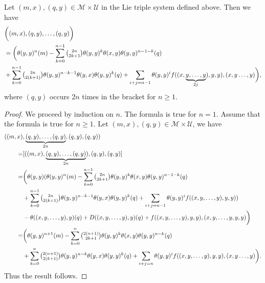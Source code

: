 \documentclass[11pt, twoside]{article}
\begin{document}
\begin{prop}\label{prop6.18}
    Let $(m,x),(q,y)\in \mathcal{M}\times \mathcal{U} $ in the Lie triple system defined above. Then we have \begin{align*}
       & \bigg((m,x),(q,y),\ldots,(q,y)\bigg)\\ &= \bigg(\theta(y,y)^n(m)- \sum\limits_{k=0}^{n-1}\tbinom{2n}{2k+1}\theta(y,y)^k\theta(x,y)\theta(y,y)^{n-1-k}(q)\\ & +\sum\limits_{k=0}^{n-1}\tbinom{2n}{2(k+1)}\theta(y,y)^{n-k-1}\theta(y,x)\theta(y,y)^k(q) + \sum\limits_{i+j=n-1}\theta(y,y)^if((x,\underbrace{y,\ldots,y}_{2j}),y,y), (x,y\ldots,y)\bigg),
    \end{align*} where $(q,y) $ occurs $2n$ times in the bracket for $n\geq 1$.
\end{prop}

\begin{proof}
    We proceed by induction on $n$. The formula is true for $n=1$. Assume that the formula is true for $n\geq 1$. Let $(m,x),(q,y)\in \mathcal{M}\times \mathcal{U}$, we have \begin{align*}
        ((m,x)&,\underbrace{(q,y),\ldots,(q,y)}_{2n},(q,y),(q,y))\\=& [((m,x),\underbrace{(q,y),\ldots,(q,y)}_{2n}),(q,y),(q,y)]\\ =& \bigg(\theta(y,y)( \theta(y,y)^n(m)- \sum\limits_{k=0}^{n-1}\tbinom{2n}{2k+1}\theta(y,y)^k\theta(x,y)\theta(y,y)^{n-1-k}(q)\\ & +\sum\limits_{k=0}^{n-1}\tbinom{2n}{2(k+1)}\theta(y,y)^{n-k-1}\theta(y,x)\theta(y,y)^k(q) + \sum\limits_{i+j=n-1}\theta(y,y)^if((x,y,\ldots,y),y,y)) \\ &- \theta((x,y,\ldots,y),y)(q) + D((x,y,\ldots,y),y)(q)+ f((x,y,\ldots,y),y,y),(x,y,\ldots,y,y,y)\bigg)\\ =& \bigg(\theta(y,y)^{n+1}(m)- \sum\limits_{k=0}^{n}\tbinom{2(n+1)}{2k+1}\theta(y,y)^k\theta(x,y)\theta(y,y)^{n-k}(q)\\ & +\sum\limits_{k=0}^{n}\tbinom{2(n+1)}{2(k+1)}\theta(y,y)^{n-k}\theta(y,x)\theta(y,y)^k(q) + \sum\limits_{i+j=n}\theta(y,y)^if((x,y,\ldots,y),y,y), (x,y\ldots,y)\bigg).
    \end{align*} Thus the result follows.
\end{proof}
\end{document}
